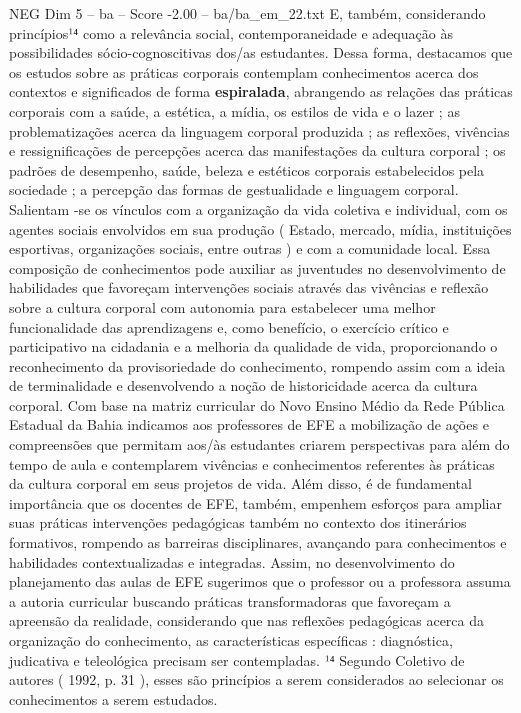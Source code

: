 \begin{textsample}{NEG Dim 5 – ba – Score -2.00 – ba/ba\_em\_22.txt}
E, também, considerando princípios¹⁴ como a relevância social, contemporaneidade e adequação às possibilidades sócio-cognoscitivas dos/as estudantes.
Dessa forma, destacamos que os estudos sobre as práticas corporais contemplam conhecimentos acerca dos contextos e significados de forma \textbf{espiralada}, abrangendo as relações das práticas corporais com a saúde, a estética, a mídia, os estilos de vida e o lazer ; as problematizações acerca da linguagem corporal produzida ; as reflexões, vivências e ressignificações de percepções acerca das manifestações da cultura corporal ; os padrões de desempenho, saúde, beleza e estéticos corporais estabelecidos pela sociedade ; a percepção das formas de gestualidade e linguagem corporal.
Salientam -se os vínculos com a organização da vida coletiva e individual, com os agentes sociais envolvidos em sua produção ( Estado, mercado, mídia, instituições esportivas, organizações sociais, entre outras ) e com a comunidade local.
Essa composição de conhecimentos pode auxiliar as juventudes no desenvolvimento de habilidades que favoreçam intervenções sociais através das vivências e reflexão sobre a cultura corporal com autonomia para estabelecer uma melhor funcionalidade das aprendizagens e, como benefício, o exercício crítico e participativo na cidadania e a melhoria da qualidade de vida, proporcionando o reconhecimento da provisoriedade do conhecimento, rompendo assim com a ideia de terminalidade e desenvolvendo a noção de historicidade acerca da cultura corporal.
Com base na matriz curricular do Novo Ensino Médio da Rede Pública Estadual da Bahia indicamos aos professores de EFE a mobilização de ações e compreensões que permitam aos/às estudantes criarem perspectivas para além do tempo de aula e contemplarem vivências e conhecimentos referentes às práticas da cultura corporal em seus projetos de vida.
Além disso, é de fundamental importância que os docentes de EFE, também, empenhem esforços para ampliar suas práticas intervenções pedagógicas também no contexto dos itinerários formativos, rompendo as barreiras disciplinares, avançando para conhecimentos e habilidades contextualizadas e integradas.
Assim, no desenvolvimento do planejamento das aulas de EFE sugerimos que o professor ou a professora assuma a autoria curricular buscando práticas transformadoras que favoreçam a apreensão da realidade, considerando que nas reflexões pedagógicas acerca da organização do conhecimento, as características específicas : diagnóstica, judicativa e teleológica precisam ser contempladas. ¹⁴ Segundo Coletivo de autores ( 1992, p. 31 ), esses são princípios a serem considerados ao selecionar os conhecimentos a serem estudados.

\end{textsample}

